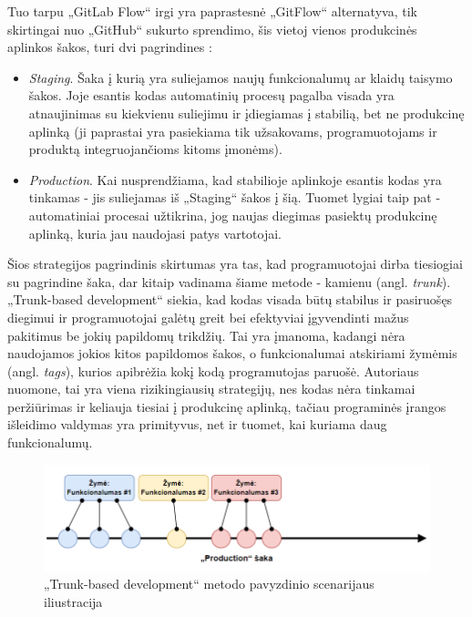 \documentclass{VUMIFPSkursinis}
\begin{document}
Tuo tarpu „GitLab Flow“ irgi yra paprastesnė „GitFlow“ alternatyva, tik skirtingai nuo „GitHub“ sukurto sprendimo, šis vietoj vienos produkcinės aplinkos šakos, turi dvi pagrindines \cite{SaltDesimtas}:

\begin{itemize}
  \item \textit{Staging}. Šaka į kurią yra suliejamos naujų funkcionalumų ar klaidų taisymo šakos. Joje esantis kodas automatinių procesų pagalba visada yra atnaujinimas su kiekvienu suliejimu ir įdiegiamas į stabilią, bet ne produkcinę aplinką (ji paprastai yra pasiekiama tik užsakovams, programuotojams ir produktą integruojančioms kitoms įmonėms).
  
  \item \textit{Production}. Kai nusprendžiama, kad stabilioje aplinkoje esantis kodas yra tinkamas - jis suliejamas iš „Staging“ šakos į šią. Tuomet lygiai taip pat - automatiniai procesai užtikrina, jog naujas diegimas pasiektų produkcinę aplinką, kuria jau naudojasi patys vartotojai.

\end{itemize}



Šios strategijos pagrindinis skirtumas yra tas, kad programuotojai dirba tiesiogiai su pagrindine šaka, dar kitaip vadinama šiame metode - kamienu (angl. \textit{trunk}). „Trunk-based development“ siekia, kad kodas visada būtų stabilus ir pasiruošęs diegimui ir programuotojai galėtų greit bei efektyviai įgyvendinti mažus pakitimus be jokių papildomų trikdžių. Tai yra įmanoma, kadangi nėra naudojamos jokios kitos papildomos šakos, o funkcionalumai atskiriami žymėmis (angl. \textit{tags}), kurios apibrėžia kokį kodą programutojas paruošė. Autoriaus nuomone, tai yra viena rizikingiausių strategijų, nes kodas nėra tinkamai peržiūrimas ir keliauja tiesiai į produkcinę aplinką, tačiau programinės įrangos išleidimo valdymas yra primityvus, net ir tuomet, kai kuriama daug funkcionalumų.

\begin{figure}[H]
    \centering
    \includegraphics[scale=0.6]{img/TrunkBased.png}
    \caption{„Trunk-based development“ metodo pavyzdinio scenarijaus iliustracija}
    \label{img:mlp}
\end{figure}
\end{document}
